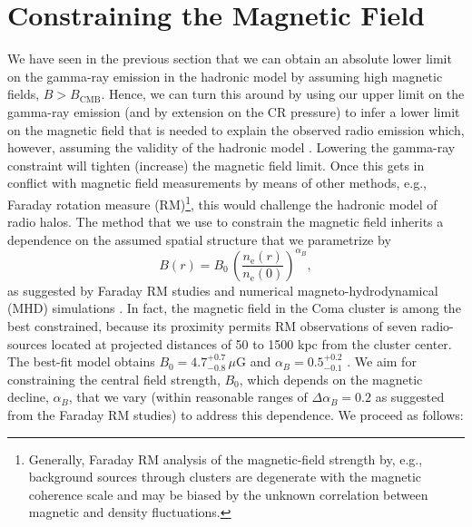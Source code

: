 \documentclass[12pt,manuscript]{aastex}
\newcommand{\rmn}{\mathrm}
\begin{document}
\section{Constraining the Magnetic Field}
\label{sec:B}
We have seen in the previous section that we can obtain an absolute lower limit on the gamma-ray emission in the hadronic model by assuming high magnetic fields, $B>B_\rmn{CMB}$. Hence, we can turn this around by using our upper limit on the gamma-ray emission (and by extension on the CR pressure) to infer a lower limit on the magnetic field that is needed to explain the observed radio emission which, however, assuming the validity of the hadronic model \citep{article:PfrommerEnsslin:2004a}. Lowering the gamma-ray constraint will tighten (increase) the magnetic field limit. Once this gets in conflict with magnetic field measurements by means of other methods, e.g., Faraday rotation measure (RM)\footnote{Generally, Faraday RM analysis of the magnetic-field strength by, e.g., background sources through clusters are degenerate with the magnetic coherence scale and may be biased by the unknown correlation between magnetic and density fluctuations.}, this would challenge the hadronic model of radio halos. The method that we use to constrain the magnetic field inherits a dependence on the assumed spatial structure that we parametrize by
\begin{equation}
\label{eq:B}
B(r) = B_{0} \,\left(\frac{n_{\rmn{e}}(r)}{n_{\rmn{e}}(0)}\right)^{\alpha_B},
\end{equation}
as suggested by Faraday RM studies and numerical magneto-hydrodynamical (MHD) simulations \citep[][and references therein]{article:Bonafede_etal:2010, article:Bonafede_etal:2011}. In fact, the magnetic field in the Coma cluster is among the best constrained, because its proximity permits RM observations of 
seven radio-sources located at projected distances of 50 to 1500 kpc from the cluster center. The best-fit model obtains $B_{0} = 4.7^{+0.7}_{-0.8}\,\mu$G and $\alpha_{B} = 0.5^{+0.2}_{-0.1}$ \citep{article:Bonafede_etal:2010}. We aim for constraining the central field strength, $B_{0}$, which depends on the magnetic decline, $\alpha_{B}$, that we vary (within reasonable ranges of $\Delta\alpha_{B}=0.2$ as suggested from the Faraday RM studies) to address this dependence. We proceed as follows:
\end{document}

